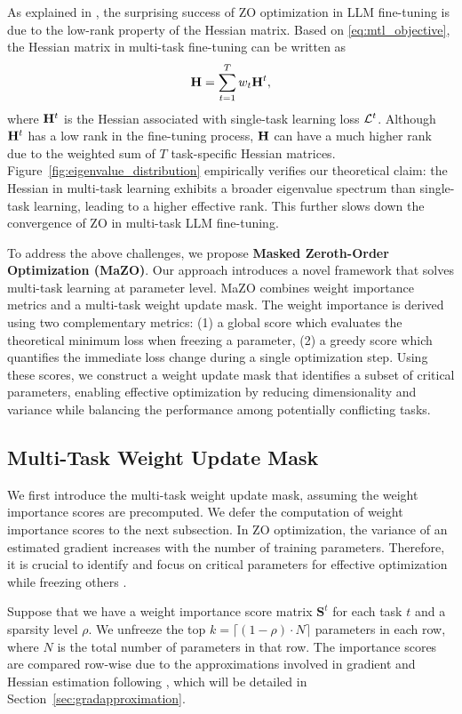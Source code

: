 As explained in \citep{malladi2023mezo}, the surprising success of ZO optimization in LLM fine-tuning is due to the low-rank property of the Hessian matrix. Based on \eqref{eq:mtl_objective}, the Hessian matrix in multi-task fine-tuning can be written as
\begin{equation}
\mathbf{H}=\sum\limits_{t=1}^T w_t \mathbf{H}^t,
\end{equation}
where $\mathbf{H}^t$ is the Hessian associated with single-task learning loss ${\cal L}^t$. Although $\mathbf{H}^t$ has a low rank in the fine-tuning process, $\mathbf{H}$ can have a much higher rank due to the weighted sum of $T$ task-specific Hessian matrices. Figure~\ref{fig:eigenvalue_distribution} empirically verifies our theoretical claim: the Hessian in multi-task learning exhibits a broader eigenvalue spectrum than single-task learning, leading to a higher effective rank. This further slows down the convergence of ZO in multi-task LLM fine-tuning. 


To address the above challenges, we propose \textbf{Masked Zeroth-Order Optimization (MaZO)}. Our approach introduces a novel framework that solves multi-task learning at parameter level. MaZO combines weight importance metrics and a multi-task weight update mask. The weight importance is derived using two complementary metrics: (1) a global score which evaluates the theoretical minimum loss when freezing a parameter, (2) a greedy score which quantifies the immediate loss change during a single optimization step. Using these scores, we construct a weight update mask that identifies a subset of critical parameters, enabling effective optimization by reducing dimensionality and variance while balancing the performance among potentially conflicting tasks. 

\subsection{Multi-Task Weight Update Mask}

We first introduce the multi-task weight update mask, assuming the weight importance scores are precomputed. We defer the computation of weight importance scores to the next subsection. In ZO optimization, the variance of an estimated gradient increases with the number of training parameters. Therefore, it is crucial to identify and focus on critical parameters for effective optimization while freezing others \citep{liu2024sparse,guo2024zeroth}.

Suppose that we have a weight importance score matrix $\mathbf{S}^t$ for each task $t$ and a sparsity level $\rho$. We unfreeze the top $k = \lceil (1 - \rho) \cdot N \rceil$ parameters in each row, where $N$ is the total number of parameters in that row. The importance scores are compared row-wise due to the approximations involved in gradient and Hessian estimation following \citet{sun2023simple}, which will be detailed in Section~\ref{sec:gradapproximation}.

